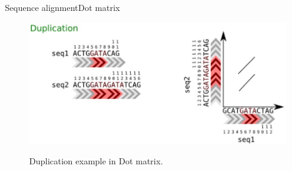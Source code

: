 \documentclass[10pt]{beamer}
\begin{document}
{%
\begin{frame}{Sequence alignment}{Dot matrix}
	
	\begin{figure}[]
		\centering
		\includegraphics[width=\textwidth,height=0.7\textheight,keepaspectratio]{img/alignment/al5.jpg}
		\label{img:uniprot}
		\caption{Duplication example in Dot matrix.}
	\end{figure}
\end{frame}

	

	

}
\end{document}
